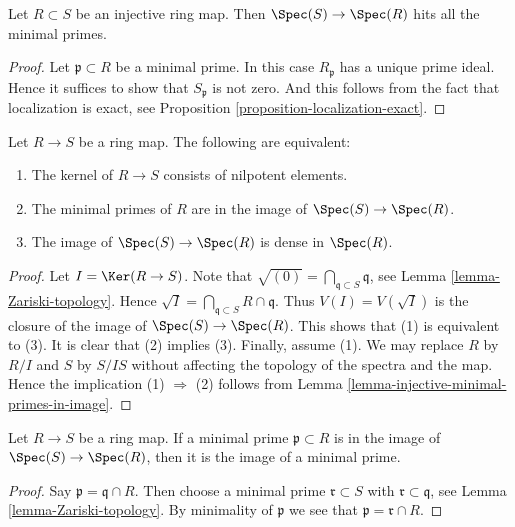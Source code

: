 \begin{lemma}
\label{lemma-injective-minimal-primes-in-image}
Let $R \subset S$ be an injective ring map.
Then $\Spec(S) \to \Spec(R)$
hits all the minimal primes.
\end{lemma}

\begin{proof}
Let $\mathfrak p \subset R$ be a minimal prime.
In this case $R_{\mathfrak p}$ has a unique prime ideal.
Hence it suffices to show that $S_{\mathfrak p}$ is not zero.
And this follows from the fact that localization is exact,
see Proposition \ref{proposition-localization-exact}.
\end{proof}

\begin{lemma}
\label{lemma-image-dense-generic-points}
Let $R \to S$ be a ring map. The following are equivalent:
\begin{enumerate}
\item The kernel of $R \to S$ consists of nilpotent elements.
\item The minimal primes of $R$ are in the image of
$\Spec(S) \to \Spec(R)$.
\item The image of $\Spec(S) \to \Spec(R)$ is dense
in $\Spec(R)$.
\end{enumerate}
\end{lemma}

\begin{proof}
Let $I = \Ker(R \to S)$. Note that
$\sqrt{(0)} = \bigcap_{\mathfrak q \subset S} \mathfrak q$, see
Lemma \ref{lemma-Zariski-topology}.
Hence $\sqrt{I} = \bigcap_{\mathfrak q \subset S} R \cap \mathfrak q$.
Thus $V(I) = V(\sqrt{I})$ is the closure of the image of
$\Spec(S) \to \Spec(R)$.
This shows that (1) is equivalent to (3). It is clear that
(2) implies (3). Finally, assume (1). We may replace
$R$ by $R/I$ and $S$ by $S/IS$ without affecting the topology
of the spectra and the map. Hence the implication (1) $\Rightarrow$ (2)
follows from Lemma \ref{lemma-injective-minimal-primes-in-image}.
\end{proof}

\begin{lemma}
\label{lemma-minimal-prime-image-minimal-prime}
Let $R \to S$ be a ring map. If a minimal prime $\mathfrak p \subset R$
is in the image of $\Spec(S) \to \Spec(R)$, then it is the image
of a minimal prime.
\end{lemma}

\begin{proof}
Say $\mathfrak p = \mathfrak q \cap R$. Then choose a minimal
prime $\mathfrak r \subset S$ with $\mathfrak r \subset \mathfrak q$, see
Lemma \ref{lemma-Zariski-topology}.
By minimality of $\mathfrak p$ we see that
$\mathfrak p = \mathfrak r \cap R$.
\end{proof}

